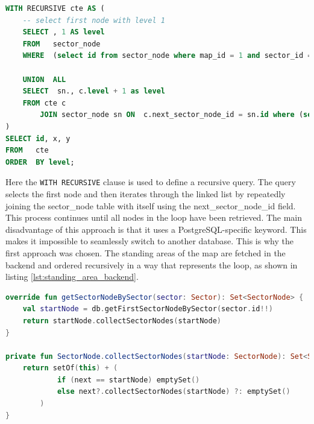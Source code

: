 \begin{lstlisting}[language=SQL, caption=Recursive Query, label=lst:recursive_query]
WITH RECURSIVE cte AS (
    -- select first node with level 1
    SELECT , 1 AS level
    FROM   sector_node
    WHERE  (select id from sector_node where map_id = 1 and sector_id = 1 LIMIT 1) = id

    UNION  ALL
    SELECT  sn., c.level + 1 as level
    FROM cte c
        JOIN sector_node sn ON  c.next_sector_node_id = sn.id where (select id from sector_node where map_id = 1 and sector_id = 1 LIMIT 1) != sn.id
)
SELECT id, x, y
FROM   cte
ORDER  BY level;
\end{lstlisting}

Here the \texttt{WITH RECURSIVE} clause is used to define a recursive query. The query selects the first node and then iterates through the linked list by repeatedly joining the sector\_node table with itself using the next\_sector\_node\_id field. This process continues until all nodes in the loop have been retrieved. The main disadvantage of this approach is that it uses a PostgreSQL-specific keyword. This makes it impossible to seamlessly switch to another database. This is why the first approach was chosen. The standing areas of the map are fetched in the backend and ordered recursively in a way that represents the loop, as shown in listing \ref{lst:standing_area_backend}.

\begin{lstlisting}[language=Kotlin, caption=Standing Area Backend, label=lst:standing_area_backend]
override fun getSectorNodeBySector(sector: Sector): Set<SectorNode> {
    val startNode = db.getFirstSectorNodeBySector(sector.id!!)
    return startNode.collectSectorNodes(startNode)
}

private fun SectorNode.collectSectorNodes(startNode: SectorNode): Set<SectorNode> {
    return setOf(this) + (
            if (next == startNode) emptySet() 
            else next?.collectSectorNodes(startNode) ?: emptySet()
        )
}
\end{lstlisting}